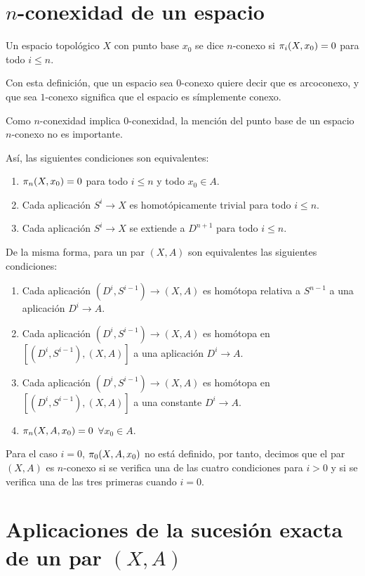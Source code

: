 \section{$n$-conexidad de un espacio}
\begin{defin}
Un espacio topológico $X$ con punto base $x_0$ se dice $n$-conexo si $\pi_{i}(X, x_0) = 0$ para todo $i \leq n$.
\end{defin}
Con esta definición, que un espacio sea $0$-conexo quiere decir que es arcoconexo, y que sea $1$-conexo significa que el espacio es símplemente conexo. \par
Como $n$-conexidad implica $0$-conexidad, la mención del punto base de un espacio $n$-conexo no es importante. \par
Así, las siguientes condiciones son equivalentes:
\begin{enumerate}
\item $\pi_{n}(X, x_0) = 0$ para todo $i \leq n$ y todo $x_0 \in A$.
\item Cada aplicación $S^i \longrightarrow X$ es homotópicamente trivial para todo $i \leq n$.
\item Cada aplicación $S^i \longrightarrow X$ se extiende a $D^{n+1}$ para todo $i \leq n$.
\end{enumerate}
De la misma forma, para un par $(X, A)$ son equivalentes las siguientes condiciones:
\begin{enumerate}
\item Cada aplicación $(D^i, S^{i-1}) \longrightarrow (X, A)$ es homótopa relativa a $S^{n-1}$ a una aplicación $D^i \longrightarrow A$.
\item Cada aplicación $(D^i, S^{i-1}) \longrightarrow (X, A)$ es homótopa en $[(D^i, S^{i-1}), (X, A)]$ a una aplicación $D^i \longrightarrow A$.
\item Cada aplicación $(D^i, S^{i-1}) \longrightarrow (X, A)$ es homótopa en $[(D^i, S^{i-1}), (X, A)]$ a una constante $D^i \longrightarrow A$.
\item $\pi_{n}(X, A, x_0) = 0$ $\forall x_0 \in A$.
\end{enumerate}
Para el caso $i = 0$, $\pi_{0}(X, A, x_0)$ no está definido, por tanto, decimos que el par $(X, A)$ es $n$-conexo si se verifica una de las cuatro condiciones para $i > 0$ y si se verifica una de las tres primeras cuando $i=0$.

\section{Aplicaciones de la sucesión exacta de un par $(X,A)$}


